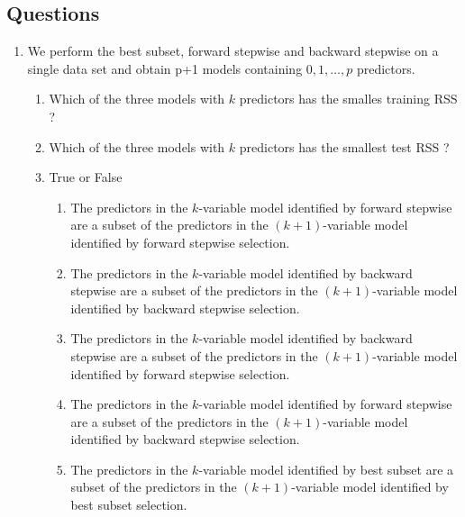 \documentclass[../statistical_learning_notes.tex]{subfiles}
\begin{document}
    \subsection{Questions}
    \begin{enumerate}
        \item We perform the best subset, forward stepwise and backward stepwise on a single data set and obtain p+1 models containing $0, 1, \ldots, p$ predictors.
        \begin{enumerate}
            \item Which of the three models with $k$ predictors has the smalles training RSS ?
            \item Which of the three models with $k$ predictors has the smallest test RSS ?
            \item True or False
            \begin{enumerate}
                \item The predictors in the $k$-variable model identified by forward stepwise are a subset of the predictors in the $(k+1)$-variable model identified by forward stepwise selection.
                \item The predictors in the $k$-variable model identified by backward stepwise are a subset of the predictors in the $(k+1)$-variable model identified by backward stepwise selection.
                \item The predictors in the $k$-variable model identified by backward stepwise are a subset of the predictors in the $(k + 1)$-variable model identified by forward stepwise selection.
                \item The predictors in the $k$-variable model identified by forward stepwise are a subset of the predictors in the $(k+1)$-variable model identified by backward stepwise selection.
                \item The predictors in the $k$-variable model identified by best subset are a subset of the predictors in the $(k + 1)$-variable model identified by best subset selection.
            \end{enumerate}
        \end{enumerate}


\end{enumerate}
\end{document}
